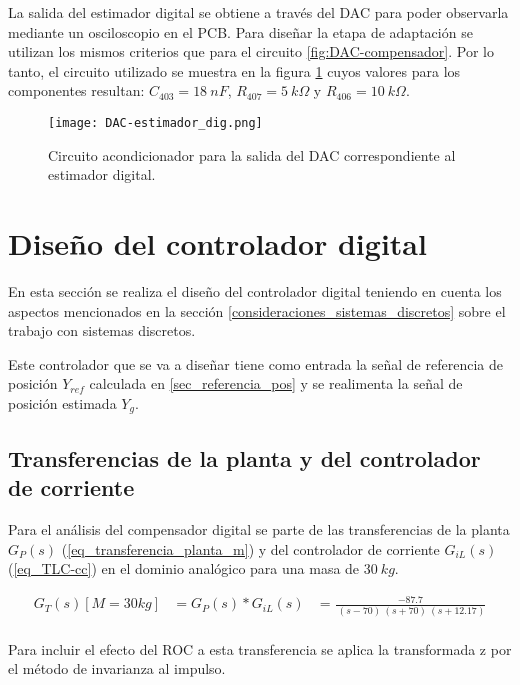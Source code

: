 La salida del estimador digital se obtiene a través del DAC para poder observarla mediante un osciloscopio en el PCB. Para diseñar la etapa de adaptación se utilizan los mismos criterios que para el circuito \ref{fig:DAC-compensador}. Por lo tanto, el circuito utilizado se muestra en la figura \ref{fig:DAC-estimador} cuyos valores para los componentes resultan: $C_{403}=18\:nF$, $R_{407}=5\:k\Omega$ y $R_{406}=10\:k\Omega$.

\begin{figure}[H]
	\centering
	\texttt{[image: DAC-estimador\_dig.png]}
	\caption{Circuito acondicionador para la salida del DAC correspondiente al estimador digital.}
	\label{fig:DAC-estimador}
\end{figure}


\section{Diseño del controlador digital}

En esta sección se realiza el diseño del controlador digital teniendo en cuenta los aspectos mencionados en la sección  \ref{consideraciones_sistemas_discretos} sobre el trabajo con sistemas discretos. 

Este controlador que se va a diseñar tiene como entrada la señal de referencia de posición $Y_{ref}$ calculada en \ref{sec_referencia_pos} y se realimenta la señal de posición estimada $Y_g$.

\subsection{Transferencias de la planta y del controlador de corriente}

 Para el análisis del compensador digital se parte de las transferencias de la planta $G_P(s)$ (\ref{eq_transferencia_planta_m}) y del controlador de corriente $G_{iL}(s) $ (\ref{eq_TLC-cc}) en el dominio analógico para una masa de $30 \:kg$.

\begin{equation} 
	\begin{aligned}
		G_T(s)[M=30kg]&=G_P(s)*G_{iL}(s)&=\frac{-87.7}{\ (s-70)\ (s+70)\ (s+12.17)}\\
	\end{aligned}
\end{equation}



Para incluir el efecto del ROC a esta transferencia se aplica la transformada z por el método de invarianza al impulso. 

